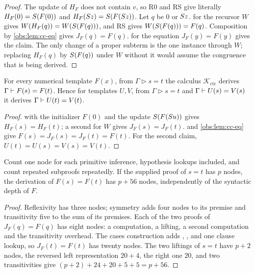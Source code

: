 \begin{proof}
The update of $H_F$ does not contain $v$, so R0 and RS give literally
$H_F(0)=S(F(0))$ and $H_F(S z)=S(F(S z))$. Let $q$ be $0$ or
$S z$.  for the recursor $W$ gives
$W(H_F(q))=W(S(F(q)))$, and RS gives $W(S(F(q)))=F(q)$. Composition by
\cref{obs:lem:cc-eq} gives $J_F(q)=F(q)$.  for the
equation $J_F(y)=F(y)$ gives the claim. The only change of a proper subterm is
the one  instance through $W$; replacing $H_F(q)$ by
$S(F(q))$ under $W$ without it would assume the congruence that is being
derived.
\end{proof}

\begin{theorem}
\label{obs:thm:cc-congruence}
For every numerical template $F(x)$, from $\Gamma\mathrel{\triangleright}s=t$
the calculus $\mathcal{K}_{\mathrm{ctr}}$ derives $\Gamma\vdash F(s)=F(t)$.
Hence for templates $U,V$, from $\Gamma\mathrel{\triangleright}s=t$ and
$\Gamma\vdash U(s)=V(s)$ it derives $\Gamma\vdash U(t)=V(t)$.
\end{theorem}

\begin{proof}
 with the initializer $F(0)$ and the update $S(F(S u))$
gives $H_F(s)=H_F(t)$; a second  for $W$ gives $J_F(s)=J_F(t)$.
 and \cref{obs:lem:cc-eq} give
$F(s)=J_F(s)=J_F(t)=F(t)$. For the second claim,
$U(t)=U(s)=V(s)=V(t)$.
\end{proof}

\begin{proposition}
\label{obs:prop:cc-nodes}
Count one node for each primitive inference, hypothesis lookups included, and
count repeated subproofs repeatedly. If the supplied proof of $s=t$ has $p$
nodes, the derivation of $F(s)=F(t)$ has $p+56$ nodes, independently of the
syntactic depth of $F$.
\end{proposition}

\begin{proof}
Reflexivity has three nodes; symmetry adds four nodes to its premise and
transitivity five to the sum of its premises. Each of the two proofs of
$J_F(q)=F(q)$ has eight nodes: a computation, a  lifting, a second
computation and the transitivity overhead. The cases construction adds
, ,  and one clause lookup, so
$J_F(t)=F(t)$ has twenty nodes. The two  liftings of $s=t$ have
$p+2$ nodes, the reversed left representation $20+4$, the right one $20$, and
two transitivities give $(p+2)+24+20+5+5=p+56$.
\end{proof}

